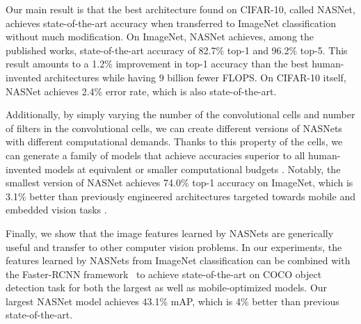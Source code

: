 Our main result is that the best architecture found on CIFAR-10, called NASNet,
achieves state-of-the-art accuracy when transferred to ImageNet classification without much modification. On ImageNet, NASNet achieves, among the published works, state-of-the-art accuracy of 82.7\% top-1 and 96.2\% top-5. This result amounts to a 1.2\% improvement in top-1 accuracy than the best human-invented architectures while having 9 billion fewer FLOPS. On CIFAR-10 itself, NASNet achieves 2.4\% error rate, which is also state-of-the-art.



  Additionally, by simply varying the number of the convolutional cells and number of filters in the convolutional cells, we can create different versions of NASNets with different computational demands. Thanks to this property of the cells, we can generate a family of models that achieve accuracies superior to all human-invented models at equivalent or smaller computational budgets \cite{szegedy2016rethinking,BatchNorm}. Notably, the smallest version of NASNet achieves 74.0\% top-1 accuracy on ImageNet, which is 3.1\% better than previously engineered architectures targeted towards mobile and embedded vision tasks \cite{howard2017mobilenets,shufflenet}.

Finally, we show that the image features learned by NASNets are generically useful and transfer to other computer vision problems. In our experiments, the features learned by NASNets from ImageNet classification can be combined with the Faster-RCNN framework~\cite{faster_rcnn} to achieve state-of-the-art on COCO object detection task for both the largest as well as mobile-optimized models. Our largest NASNet model achieves 43.1\% mAP, which is 4\% better than previous state-of-the-art. %








